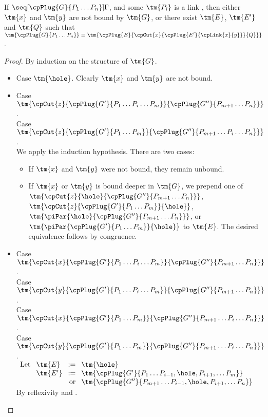 \begin{lemma}\label{lem:cp-progress-link}
  If $\seq[{ \cpPlug{G}{P_1 \dots P_n} }]{ \Gamma }$, and some $\tm{P_i}$ is a
  link , then either $\tm{x}$ and $\tm{y}$ are not bound by
  $\tm{G}$, or there exist $\tm{E}$, $\tm{E'}$ and $\tm{Q}$ such that
  $\tm{\cpPlug{G}{P_1 \dots P_n}} \equiv
  \tm{\cpPlug{E}{\cpCut{x}{\cpPlug{E'}{\cpLink{x}{y}}}{Q}}}$. 
\end{lemma}
\begin{proof}
  By induction on the structure of $\tm{G}$.
  \begin{itemize}
  \item
    Case $\tm{\hole}$. Clearly $\tm{x}$ and $\tm{y}$ are not bound.
  \item
    Case $\tm{\cpCut{z}{\cpPlug{G'}{P_1 \dots P_i \dots P_m}}{\cpPlug{G''}{P_{m+1} \dots P_n}}}$.\\
    Case $\tm{\cpCut{z}{\cpPlug{G'}{P_1 \dots P_m}}{\cpPlug{G''}{P_{m+1} \dots P_i \dots P_n}}}$.\\
    We apply the induction hypothesis. There are two cases:
    \begin{itemize}
    \item
      If $\tm{x}$ and $\tm{y}$ were not bound, they remain unbound.
    \item
      If $\tm{x}$ or $\tm{y}$ is bound deeper in $\tm{G}$, we prepend one of
      $\tm{\cpCut{z}{\hole}{\cpPlug{G''}{P_{m+1} \dots P_n}}}$,
      $\tm{\cpCut{z}{\cpPlug{G'}{P_1 \dots P_m}}{\hole}}$,
      $\tm{\piPar{\hole}{\cpPlug{G''}{P_{m+1} \dots P_n}}}$, or
      $\tm{\piPar{\cpPlug{G'}{P_1 \dots P_m}}{\hole}}$ to $\tm{E}$.
      The desired equivalence follows by congruence.
    \end{itemize}
  \item
    Case $\tm{\cpCut{x}{\cpPlug{G'}{P_1 \dots P_i \dots P_m}}{\cpPlug{G''}{P_{m+1} \dots P_n}}}$.\\
    Case $\tm{\cpCut{y}{\cpPlug{G'}{P_1 \dots P_i \dots P_m}}{\cpPlug{G''}{P_{m+1} \dots P_n}}}$.\\
    Case $\tm{\cpCut{x}{\cpPlug{G'}{P_1 \dots P_m}}{\cpPlug{G''}{P_{m+1} \dots P_i \dots P_n}}}$.\\
    Case $\tm{\cpCut{y}{\cpPlug{G'}{P_1 \dots P_m}}{\cpPlug{G''}{P_{m+1} \dots P_i \dots P_n}}}$.
    \\
    \(
    \arraycolsep=4pt
    \begin{array}[t]{llrl}
      \text{Let} & \tm{E}  & :=       & \tm{\hole} \\
                 & \tm{E'} & :=       & \tm{\cpPlug{G'}{P_1 \dots P_{i-1}, \hole, P_{i+1}, \dots P_m}} \\
                 &         &\text{or} & \tm{\cpPlug{G''}{P_{m+1} \dots P_{i-1}, \hole, P_{i+1}, \dots P_n}}
    \end{array}
    \)
    \\[1ex]
    By reflexivity and \cpEquivCutComm.
  \end{itemize}
\end{proof}

